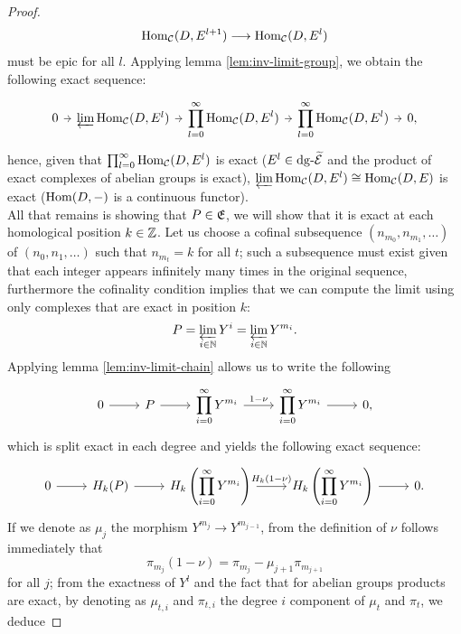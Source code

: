 \begin{proof}
    \[{\mathrm{Hom}_{\mathcal{C}}(D, E^{l+1})} \longrightarrow {\mathrm{Hom}_{\mathcal{C}}(D, E^l)}\]
    must be epic for all $l$. Applying lemma \ref{lem:inv-limit-group}, we obtain the following exact sequence:
    \[\begin{tikzcd}[sep=tiny]
        0 & {\varprojlim \Hom_\C(D,E^l)} & {\displaystyle \prod_{l=0}^{\infty}\Hom_\C(D,E^l)} & {\displaystyle \prod_{l=0}^{\infty}\Hom_\C(D,E^l)} & {0,}
        \arrow[from=1-1, to=1-2]
        \arrow[from=1-2, to=1-3]
        \arrow[from=1-3, to=1-4]
        \arrow[from=1-4, to=1-5]
    \end{tikzcd}\]
    hence, given that $\prod_{l=0}^{\infty}\mathrm{Hom}_{\mathcal{C}}(D,E^l)$ is exact ($E^l \in \mathrm{dg} \text{-}\widetilde{\mathcal{E}}$ and the product of exact complexes of abelian groups is exact), $\varprojlim \mathrm{Hom}_{\mathcal{C}}(D,E^l) \cong \mathrm{Hom}_{\mathcal{C}}(D,E)$ is exact ($\mathrm{Hom}(D, {-})$ is a continuous functor).\\
    All that remains is showing that $P \in \mathfrak{E}$, we will show that it is exact at each homological position $k \in \mathbb{Z}$. Let us choose a cofinal subsequence $(n_{m_0}, n_{m_1}, \dots)$ of $(n_0, n_1, \dots)$ such that $n_{m_t} = k$ for all $t$; such a subsequence must exist given that each integer appears infinitely many times in the original sequence, furthermore the cofinality condition implies that we can compute the limit using only complexes that are exact in position $k$:
    \[P = \varprojlim_{i \in \mathbb{N}} Y^i = \varprojlim_{i \in \mathbb{N}} Y^{m_i}.\]
    Applying lemma \ref{lem:inv-limit-chain} allows us to write the following
    \[\begin{tikzcd}
        0 & P & {\displaystyle\prod_{i = 0} ^{\infty} Y^{m_i}} & {\displaystyle\prod_{i = 0} ^{\infty} Y^{m_i}} & {0,}
        \arrow[from=1-1, to=1-2]
        \arrow[from=1-2, to=1-3]
        \arrow["1-\nu", from=1-3, to=1-4]
        \arrow[from=1-4, to=1-5]
    \end{tikzcd}\]
    which is split exact in each degree and yields the following exact sequence:
    \[\begin{tikzcd}
        { 0} & {H_k(P)} & {H_k\left({\displaystyle\prod_{i = 0} ^{\infty} Y^{m_i}}\right)} & {H_k\left({\displaystyle\prod_{i = 0} ^{\infty} Y^{m_i}}\right)} & {0.}
        \arrow[from=1-1, to=1-2]
        \arrow[from=1-2, to=1-3]
        \arrow["{H_k(1- \nu)}", from=1-3, to=1-4]
        \arrow[from=1-4, to=1-5]
    \end{tikzcd}\]
    If we denote as $\mu_j$ the morphism $Y^{m_j} \longrightarrow Y^{m_{j-1}}$, from the definition of $\nu$ follows immediately that \[\pi_{m_j} (1-\nu) = \pi_{m_j} - \mu_{j+1} \pi_{{m_{j+1}}}\] for all $j$; from the exactness of $Y^l$ and the fact that for abelian groups products are exact, by denoting as $\mu_{t,i}$ and $\pi_{t,i}$ the degree $i$ component of $\mu_t$ and $\pi_t$, we deduce  

\end{proof}
